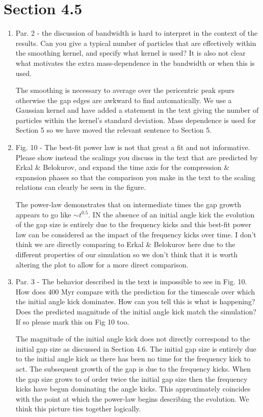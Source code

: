 \documentclass{article}
\begin{document}
\section{Section 4.5}
\begin{enumerate}
\item Par. 2 - the discussion of bandwidth is hard to interpret in the context of the results. Can
you give a typical number of particles that are effectively within the smoothing kernel,
and specify what kernel is used? It is also not clear what motivates the extra
mass-dependence in the bandwidth or when this is used.

{\color{red} The smoothing is necessary to average over the pericentric peak spurs otherwise the gap edges are awkward to find automatically. We use a Gaussian kernel and have added a statement in the text giving the number of particles within the kernel's standard deviation. Mass dependence is used for Section 5 so we have moved the relevant sentence to Section 5.}

\item Fig. 10 - The best-fit power law is not that great a fit and not informative. Please show
instead the scalings you discuss in the text that are predicted by Erkal \& Belokurov, and
expand the time axis for the compression \& expansion phases so that the comparison
you make in the text to the scaling relations can clearly be seen in the figure.

{\color{red} The power-law demonstrates that on intermediate times the gap growth appears to go like $\sim t^{0.5}$. IN the absence of an initial angle kick the evolution of the gap size is entirely due to the frequency kicks and this best-fit power law can be considered as the impact of the frequency kicks over time. I don't think we are directly comparing to Erkal \& Belokurov here due to the different properties of our simulation so we don't think that it is worth altering the plot to allow for a more direct comparison.}


\item Par. 3 - The behavior described in the text is impossible to see in Fig. 10. How does 400
Myr compare with the prediction for the timescale over which the initial angle kick
dominates. How can you tell this is what is happening? Does the predicted magnitude of
the initial angle kick match the simulation? If so please mark this on Fig 10 too.

{\color{red} The magnitude of the initial angle kick does not directly correspond to the initial gap size as discussed in Section 4.6. The initial gap size is entirely due to the initial angle kick as there has been no time for the frequency kick to act. The subsequent growth of the gap is due to the frequency kicks. When the gap size grows to of order twice the initial gap size then the frequency kicks have begun dominating the angle kicks. This approximately coincides with the point at which the power-law begins describing the evolution. We think this picture ties together logically.}


\end{enumerate}
\end{document}
